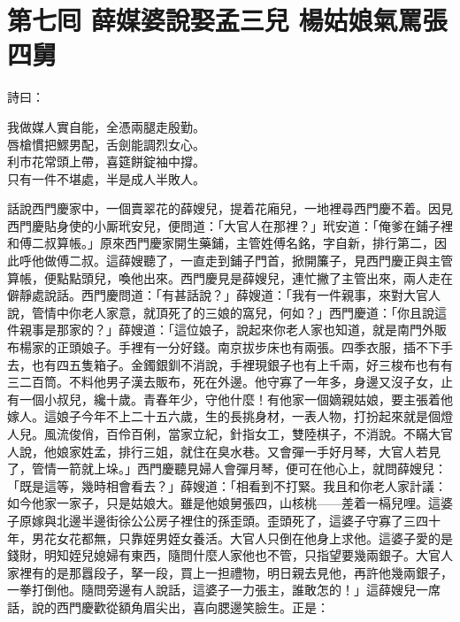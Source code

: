 
\chapter*{第七囘 薛媒婆說娶孟三兒 楊姑娘氣罵張四舅}


詩曰：

\begin{myquote} 
我做媒人實自能，全憑兩腿走殷勤。\\唇槍慣把鰥男配，舌劍能調烈女心。\\利市花常頭上帶，喜筵餅錠袖中撐。\\只有一件不堪處，半是成人半敗人。
\end{myquote} 

話說西門慶家中，一個賣翠花的薛嫂兒，提着花廂兒，一地裡尋西門慶不着。因見西門慶貼身使的小厮玳安兒，便問道：「大官人在那裡？」玳安道：「俺爹在鋪子裡和傅二叔算帳。」原來西門慶家開生藥鋪，主管姓傅名銘，字自新，排行第二，因此呼他做傅二叔。這薛嫂聽了，一直走到鋪子門首，掀開簾子，見西門慶正與主管算帳，便點點頭兒，喚他出來。西門慶見是薛嫂兒，連忙撇了主管出來，兩人走在僻靜處說話。西門慶問道：「有甚話說？」薛嫂道：「我有一件親事，來對大官人說，管情中你老人家意，就頂死了的三娘的窩兒，{}何如？」西門慶道：「你且說這件親事是那家的？」薛嫂道：「這位娘子，說起來你老人家也知道，就是南門外販布楊家的正頭娘子。手裡有一分好錢。南京拔步床也有兩張。四季衣服，插不下手去，也有四五隻箱子。金鐲銀釧不消說，手裡現銀子也有上千兩，好三梭布也有有三二百筒。不料他男子漢去販布，死在外邊。他守寡了一年多，身邊又沒子女，止有一個小叔兒，纔十歲。青春年少，守他什麼！有他家一個嫡親姑娘，要主張着他嫁人。這娘子今年不上二十五六歲，{}生的長挑身材，一表人物，打扮起來就是個燈人兒。風流俊俏，百伶百俐，當家立紀，針指女工，雙陸棋子，不消說。不瞞大官人說，{}他娘家姓孟，排行三姐，就住在臭水巷。{}又會彈一手好月琴，大官人若見了，管情一箭就上垛。」西門慶聽見婦人會彈月琴，便可在他心上，就問薛嫂兒：「既是這等，幾時相會看去？」薛嫂道：「相看到不打緊。我且和你老人家計議：{}如今他家一家子，只是姑娘大。雖是他娘舅張四，山核桃——差着一槅兒哩。這婆子原嫁與北邊半邊街徐公公房子裡住的孫歪頭。{}歪頭死了，這婆子守寡了三四十年，男花女花都無，只靠姪男姪女養活。大官人只倒在他身上求他。這婆子愛的是錢財，明知姪兒媳婦有東西，隨問什麼人家他也不管，只指望要幾兩銀子。大官人家裡有的是那囂段子，拏一段，買上一担禮物，明日親去見他，再許他幾兩銀子，一拳打倒他。{}隨問旁邊有人說話，這婆子一力張主，誰敢怎的！」這薛嫂兒一席話，說的西門慶歡從額角眉尖出，喜向腮邊笑臉生。正是：

